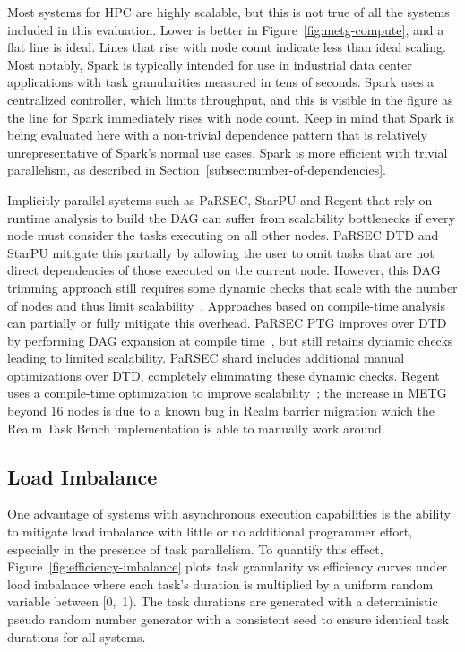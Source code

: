 Most systems for HPC are highly scalable,
but this is not true of all the systems included in this
evaluation. Lower is better in Figure~\ref{fig:metg-compute}, and a
flat line is ideal. Lines that rise with node count indicate less than
ideal scaling. Most notably, Spark is typically
intended for use in industrial data center applications with task
granularities measured in tens of seconds. Spark uses a centralized
controller, which limits throughput, and this is visible in the figure
as the line for Spark immediately rises with node count. Keep in mind
that Spark is being evaluated here with a non-trivial dependence
pattern that is relatively unrepresentative of Spark's normal use
cases. Spark is more efficient with trivial parallelism, as described
in Section~\ref{subsec:number-of-dependencies}.

Implicitly parallel systems such as PaRSEC, StarPU and Regent that
rely on runtime analysis to build the DAG can suffer from
scalability bottlenecks if every node must consider the tasks
executing on all other nodes. PaRSEC DTD and StarPU mitigate this
partially by allowing the user to omit tasks that are not direct
dependencies of those executed on the current node. However, this DAG
trimming approach still requires some dynamic checks that scale with
the number of nodes and thus limit scalability~\cite{PARSEC_DTD}. Approaches based on compile-time analysis can
partially or fully mitigate this overhead. PaRSEC PTG improves over DTD 
by performing DAG expansion at compile time~\cite{PARSEC_DTD}, but
still retains dynamic checks leading to limited scalability. PaRSEC shard includes additional manual optimizations over DTD, completely eliminating these dynamic checks. Regent
uses a compile-time optimization to improve
scalability~\cite{ControlReplication17}; the increase in METG beyond 16 nodes is due to a known bug in Realm barrier migration which the Realm Task Bench implementation is able to manually work around.



\subsection{Load Imbalance}



One advantage of systems with asynchronous execution capabilities is
the ability to mitigate load imbalance with little or no additional programmer effort, especially in the presence of
task parallelism. To quantify this effect,
Figure~\ref{fig:efficiency-imbalance} plots task granularity vs
efficiency curves under load imbalance where each task's duration is multiplied by a uniform random variable between [0,~1). The task durations are generated with a deterministic
pseudo random number generator with a consistent seed to ensure
identical task durations for all systems.

